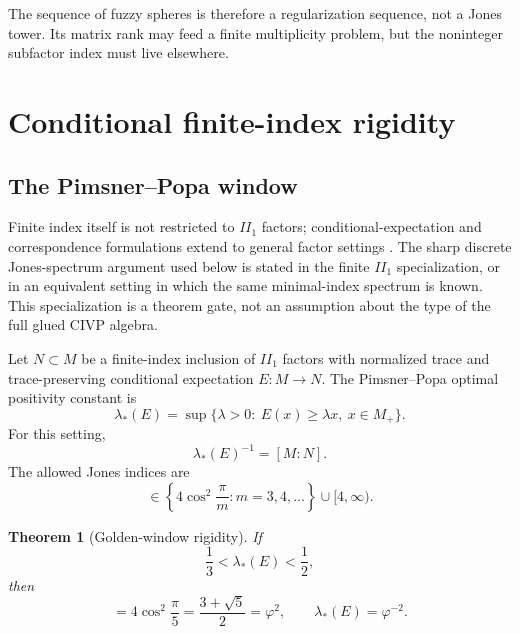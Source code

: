 \documentclass[aps,prd,preprint,nofootinbib,superscriptaddress]{revtex4-2}
\newtheorem{theorem}{Theorem}[section]
\theoremstyle{definition}
\theoremstyle{remark}
\newcommand{\PP}{\lambda_*}
\begin{document}
The sequence of fuzzy spheres is therefore a regularization sequence, not a Jones tower.  Its matrix rank may feed a finite multiplicity problem, but the noninteger subfactor index must live elsewhere.


\section{Conditional finite-index rigidity}
\label{sec:index}

\subsection{The Pimsner--Popa window}

Finite index itself is not restricted to $II_1$ factors; conditional-expectation and correspondence formulations extend to general factor settings \cite{Kosaki1986,LongoRehren1995,LongoRoberts1997,FrankKirchberg1998}.  The sharp discrete Jones-spectrum argument used below is stated in the finite $II_1$ specialization, or in an equivalent setting in which the same minimal-index spectrum is known.  This specialization is a theorem gate, not an assumption about the type of the full glued CIVP algebra.

Let $N\subset M$ be a finite-index inclusion of $II_1$ factors with normalized trace and trace-preserving conditional expectation $E:M\to N$.  The Pimsner--Popa optimal positivity constant is
\begin{equation}
\PP(E)
=
\sup\{\lambda>0:\ E(x)\ge\lambda x,\ x\in M_+\}.
\label{eq:ppdef}
\end{equation}
For this setting,
\begin{equation}
\PP(E)^{-1}=[M:N].
\label{eq:ppindex}
\end{equation}
The allowed Jones indices are \cite{Jones1983,PimsnerPopa1986}
\begin{equation}
[M:N]\in
\left\{
4\cos^2\frac{\pi}{m}:m=3,4,\ldots
\right\}
\cup[4,\infty).
\label{eq:jones-spectrum}
\end{equation}

\begin{theorem}[Golden-window rigidity]
\label{thm:goldwindow}
If
\begin{equation}
\frac13<\PP(E)<\frac12,
\end{equation}
then
\begin{equation}
[M:N]=4\cos^2\frac{\pi}{5}
=
\frac{3+\sqrt5}{2}
=
\varphi^2,
\qquad
\PP(E)=\varphi^{-2}.
\label{eq:goldindex}
\end{equation}
\end{theorem}
\end{document}
